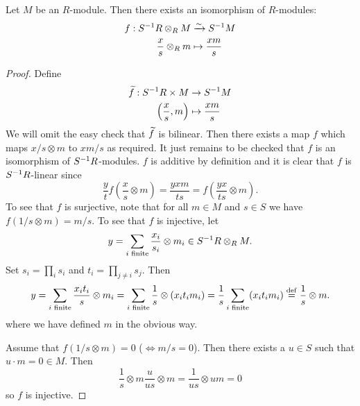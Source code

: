 \begin{prop}
  Let $M$ be an $R$-module.
  Then there exists an isomorphism of $R$-modules:
  \begin{align*}
    f: S^{-1} R \otimes_R M &\xrightarrow{\sim} S^{-1} M \\
    \frac{x}{s} \otimes_R m &\mapsto \frac{xm}{s}
  \end{align*}
\end{prop}

\begin{proof}
  Define
  \begin{align*}
    \widetilde f: S^{-1} R \times M &\to S^{-1} M \\
    \left( \frac{x}{s}, m \right) &\mapsto \frac{xm}{s}
  \end{align*}
  We will omit the easy check that $\widetilde f$ is bilinear.
  Then there exists a map $f$ which maps $x/s \otimes m$ to $xm/s$ as required.
  It just remains to be checked that $f$ is an isomorphism of $S^{-1} R$-modules.
  $f$ is additive by definition and it is clear that $f$ is $S^{-1} R$-linear since
  \[\frac{y}{t} f \left( \frac{x}{s} \otimes m \right) = \frac{yxm}{ts} = f \left( \frac{yx}{ts} \otimes m \right).\]
  To see that $f$ is surjective, note that for all $m \in M$ and $s \in S$ we have $f(1/s \otimes m) = m/s$.
  To see that $f$ is injective, let
  \[y = \sum_{i \text{ finite}} \frac{x_i}{s_i} \otimes m_i \in S^{-1} R \otimes_R M.\]
  Set $s_i=\prod_i s_i$ and $t_i = \prod_{j \neq i} s_j$.
  Then
  \[y = \sum_{i \text{ finite}} \frac{x_it_i}{s} \otimes m_i = \sum_{i \text{ finite}} \frac{1}{s} \otimes (x_it_im_i) = \frac{1}{s} \sum_{i \text{ finite}} (x_it_im_i) \overset{\mathrm{def}}{=} \frac{1}{s} \otimes m.\]
  where we have defined $m$ in the obvious way.

  Assume that $f(1/s \otimes m)=0$ ($\iff m/s=0$).
  Then there exists a $u \in S$ such that $u \cdot m = 0 \in M$.
  Then
  \[\frac{1}{s} \otimes m \frac{u}{us} \otimes m = \frac{1}{us} \otimes um = 0\]
  so $f$ is injective.
\end{proof}

